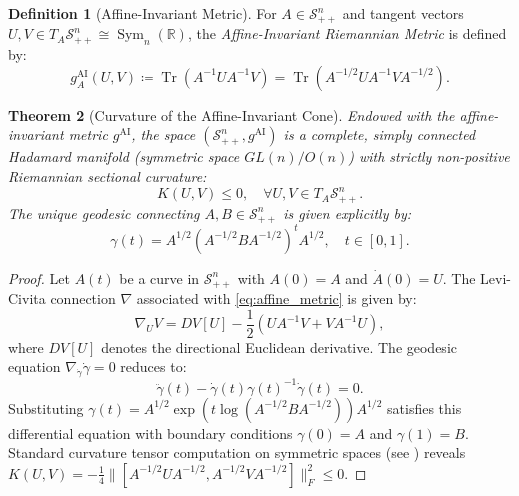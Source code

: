 \documentclass[11pt,a4paper,reqno]{amsart}
\newtheorem{theorem}{Theorem}[section]
\theoremstyle{definition}
\newtheorem{definition}[theorem]{Definition}
\numberwithin{equation}{section}
\providecommand{\R}{\mathbb{R}}
\newcommand{\Tr}{\operatorname{Tr}}
\providecommand{\R}{\mathbb{R}}
\begin{document}
\begin{definition}[Affine-Invariant Metric]
For $A \in \mathcal{S}_{++}^n$ and tangent vectors $U, V \in T_A \mathcal{S}_{++}^n \cong \operatorname{Sym}_n(\R)$, the \emph{Affine-Invariant Riemannian Metric} is defined by:
\begin{equation}
    \label{eq:affine_metric}
    g_A^{\mathrm{AI}}(U, V) \coloneqq \Tr\left( A^{-1} U A^{-1} V \right) = \Tr\left( A^{-1/2} U A^{-1} V A^{-1/2} \right).
\end{equation}
\end{definition}

\begin{theorem}[Curvature of the Affine-Invariant Cone]
\label{thm:cone_curvature}
Endowed with the affine-invariant metric $g^{\mathrm{AI}}$, the space $(\mathcal{S}_{++}^n, g^{\mathrm{AI}})$ is a complete, simply connected Hadamard manifold (symmetric space $GL(n)/O(n)$) with strictly non-positive Riemannian sectional curvature:
\begin{equation}
    K(U, V) \le 0, \quad \forall U, V \in T_A \mathcal{S}_{++}^n.
\end{equation}
The unique geodesic connecting $A, B \in \mathcal{S}_{++}^n$ is given explicitly by:
\begin{equation}
    \label{eq:cone_geodesic}
    \gamma(t) = A^{1/2} \left( A^{-1/2} B A^{-1/2} \right)^t A^{1/2}, \quad t \in [0, 1].
\end{equation}
\end{theorem}
\begin{proof}
Let $A(t)$ be a curve in $\mathcal{S}_{++}^n$ with $A(0) = A$ and $\dot{A}(0) = U$. The Levi-Civita connection $\nabla$ associated with \eqref{eq:affine_metric} is given by:
\begin{equation}
    \nabla_U V = D V[U] - \frac{1}{2}(U A^{-1} V + V A^{-1} U),
\end{equation}
where $D V[U]$ denotes the directional Euclidean derivative. The geodesic equation $\nabla_{\dot{\gamma}} \dot{\gamma} = 0$ reduces to:
\begin{equation}
    \ddot{\gamma}(t) - \dot{\gamma}(t) \gamma(t)^{-1} \dot{\gamma}(t) = 0.
\end{equation}
Substituting $\gamma(t) = A^{1/2} \exp(t \log(A^{-1/2} B A^{-1/2})) A^{1/2}$ satisfies this differential equation with boundary conditions $\gamma(0) = A$ and $\gamma(1) = B$. Standard curvature tensor computation on symmetric spaces (see \cite{bhatia2009positive}) reveals $K(U, V) = -\frac{1}{4} \|[A^{-1/2} U A^{-1/2}, A^{-1/2} V A^{-1/2}]\|_F^2 \le 0$.
\end{proof}
\end{document}
